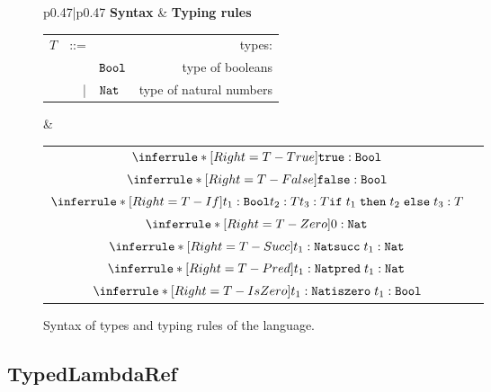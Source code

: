 \begin{figure*}[h]
\footnotesize
\begin{tabular}{p{}|p{}}
    \textbf{Syntax} & \textbf{Typing rules} \tabularnewline[1em]
    \begin{tabular}{r@{\hspace{0.5em}}r@{\hspace{0.5em}}l@{\hspace{1.0em}}r}
        $T$ & ::= &         & types:                  \\
            &     & $\texttt{Bool}$ & type of booleans        \\
            & |   & $\texttt{Nat}$  & type of natural numbers \\
    \end{tabular}
&
    \renewcommand{\arraystretch}{2.5}
    \begin{tabular}{cr}
        $\inferrule*[Right=T-True]
            { }
            {\true : \Bool}$ & \\
        $\inferrule*[Right=T-False]
            { }
            {\false : \Bool}$ & \\
        $\inferrule*[Right=T-If]
            {t_1 : \Bool \\ t_2 : T \\ t_3 : T}
            {\ift{t_1}{t_2}{t_3} : T}$ & \\
        $\inferrule*[Right=T-Zero]
            { }
            {\zero : \Nat}$ & \\
        $\inferrule*[Right=T-Succ]
            {t_1 : \Nat}
            {\succt{t_1} : \Nat}$ & \\
        $\inferrule*[Right=T-Pred]
            {t_1 : \Nat}
            {\predt{t_1} : \Nat}$ & \\
        $\inferrule*[Right=T-IsZero]
            {t_1 : \Nat}
            {\iszerot{t_1} : \Bool}$ & 
    \end{tabular}
\end{tabular}
\caption{Syntax of types and typing rules of the  language.}
\label{fig:language-definition-typedarith-types}
\end{figure*}



\subsection{TypedLambdaRef}
\label{sec:language-definition-typedlambdaref}

